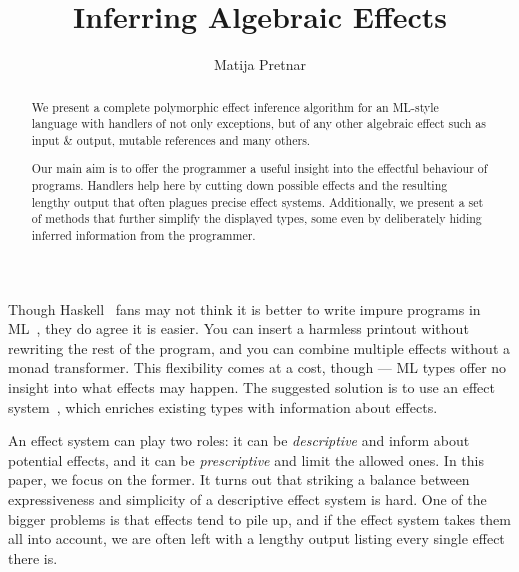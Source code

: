 \documentclass{LMCS}
\begin{document}
\title{Inferring Algebraic Effects}

\author{Matija Pretnar}
\address{Faculty of Mathematics and Physics, University of Ljubljana, Slovenia}


\begin{abstract}
  \noindent
  We present a complete polymorphic effect inference algorithm
  for an ML-style language with handlers of not only exceptions,
  but of any other algebraic effect such as
  input \& output, mutable references and many others.

  Our main aim is to offer the programmer a useful insight into the effectful behaviour of programs.
  Handlers help here by cutting down possible effects
  and the resulting lengthy output that often plagues precise effect systems.
  Additionally, we present a set of methods
  that further simplify the displayed types,
  some even by deliberately hiding inferred information from the programmer.
\end{abstract}

\maketitle

\noindent
Though Haskell~\cite{jones2003haskell} fans may not think it is better to write impure programs in ML~\cite{milner1997definition},
they do agree it is easier.
You can insert a harmless printout without rewriting the rest of the program,
and you can combine multiple effects without a monad transformer.
This flexibility comes at a cost, though ---
ML types offer no insight into what effects may happen.
The suggested solution is to use an effect system~\cite{lucassen1988polymorphic,talpin1992type,benton1998compiling,tolmach1998optimizing,wadler1999marriage,benton2002monads,rytz2012lightweight},
which enriches existing types with information about effects.

An effect system can play two roles:
it can be \emph{descriptive} and inform about potential effects,
and it can be \emph{prescriptive} and limit the allowed ones.
In this paper, we focus on the former.
It turns out that striking a balance between expressiveness and simplicity of a descriptive effect system is hard.
One of the bigger problems is that effects tend to pile up,
and if the effect system takes them all into account,
we are often left with a lengthy output listing every single effect there is.
\end{document}
